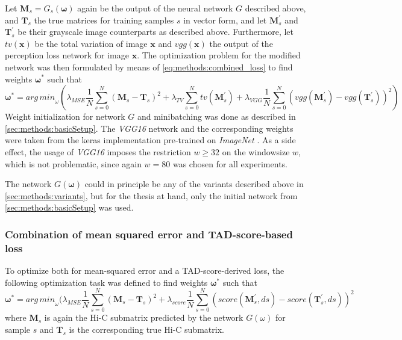 Let $\mathbf{M}_s=G_s(\bm{\omega})$ again be the output of the neural network $G$ described above, and $\mathbf{T}_s$ the true matrices for training samples $s$ in vector form,
and let $\mathbf{M}^\prime_s$ and $\mathbf{T}^\prime_s$ be their grayscale image counterparts as described above.
Furthermore, let $\mathit{tv}(\mathbf{x})$ be the total variation of image $\mathbf{x}$ and $\mathit{vgg}(\mathbf{x})$ the output of the perception loss network for image $\mathbf{x}$.
The optimization problem for the modified network was then formulated by means of \cref{eq:methods:combined_loss} to find weights $\bm{\omega}^*$ such that
\begin{equation}
 \bm{\omega}^* = \mathit{arg\,min}_\omega (  \lambda_\mathit{MSE} \frac{1}{N} \sum_{s=0}^N (\mathbf{M}_s - \mathbf{T}_s)^2 
                                                     + \lambda_\mathit{TV} \sum_{s=0}^N \mathit{tv}( \mathbf{M}^\prime_s) 
                                                     + \lambda_\mathit{VGG} \frac{1}{N} \sum_{s=0}^N (\mathit{vgg}(\mathbf{M}^\prime_s) - \mathit{vgg}(\mathbf{T}^\prime_s))^2 ) \label{eq:methods:combined_loss}
\end{equation}
Weight initialization for network $G$ and minibatching was done as described in \cref{sec:methods:basicSetup}.
The \emph{VGG16} network and the corresponding weights were taken from the keras implementation pre-trained on \emph{ImageNet} \cite{deng2009}.
As a side effect, the usage of \emph{VGG16} imposes the restriction $w \geq 32$ on the windowsize $w$, which is not problematic, since again $w=80$ was chosen for all experiments.

The network $G(\bm{\omega})$ could in principle be any of the variants described above in \cref{sec:methods:variants},
but for the thesis at hand, only the initial network from \cref{sec:methods:basicSetup} was used.

\subsubsection{Combination of mean squared error and TAD-score-based loss} \label{sec:methods:score_loss}
To optimize both for mean-squared error and a TAD-score-derived loss, the following optimization task was defined to find weights $\bm{\omega}^*$ such that
\begin{equation}
 \bm{\omega}^* = \mathit{arg\,min}_\omega (  \lambda_\mathit{MSE} \frac{1}{N} \sum_{s=0}^N (\mathbf{M}_s - \mathbf{T}_s)^2
                                                    + \lambda_\mathit{score} \frac{1}{N} \sum_{s=0}^N (\mathit{score}(\mathbf{M}^\prime_s,ds) - \mathit{score}(\mathbf{T}^\prime_s,ds))^2 \label{eq:methods:score_loss}
\end{equation}
where $\mathbf{M}_s$ is again the Hi-C submatrix predicted by the network $G(\omega)$ for sample $s$ and $\mathbf{T}_s$ is the corresponding true Hi-C submatrix.

